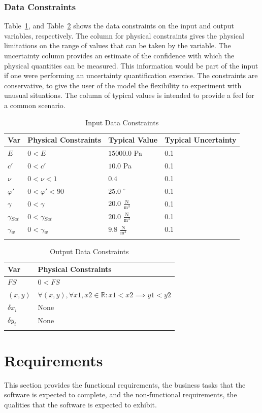 \documentclass[12pt]{article}
\begin{document}
\subsubsection{Data Constraints}
\label{Sec:DataCons}
Table~\ref{Table:InpuDataCons}, and Table~\ref{Table:OutpDataCons} shows the data constraints on the input and output variables, respectively. The column for physical constraints gives the physical limitations on the range of values that can be taken by the variable. The uncertainty column provides an estimate of the confidence with which the physical quantities can be measured. This information would be part of the input if one were performing an uncertainty quantification exercise. The constraints are conservative, to give the user of the model the flexibility to experiment with unusual situations. The column of typical values is intended to provide a feel for a common scenario.
\begin{longtable}{l l l l}
\toprule
Var & Physical Constraints & Typical Value & Typical Uncertainty
\\
\midrule
$E$ & $0<E$ & $15000.0$ Pa & 0.1
\\
$c'$ & $0<c'$ & $10.0$ Pa & 0.1
\\
$\nu{}$ & $0<\nu{}<1$ & $0.4$ & 0.1
\\
$\varphi{}'$ & $0<\varphi{}'<90$ & $25.0$ ${}^{\circ}$ & 0.1
\\
$\gamma{}$ & $0<\gamma{}$ & $20.0$ $\frac{\text{N}}{\text{m}^{3}}$ & 0.1
\\
$\gamma{}_{Sat}$ & $0<\gamma{}_{Sat}$ & $20.0$ $\frac{\text{N}}{\text{m}^{3}}$ & 0.1
\\
$\gamma{}_{w}$ & $0<\gamma{}_{w}$ & $9.8$ $\frac{\text{N}}{\text{m}^{3}}$ & 0.1
\\
\bottomrule
\caption{Input Data Constraints}
\label{Table:InpuDataCons}
\end{longtable}
\begin{longtable}{l l}
\toprule
Var & Physical Constraints
\\
\midrule
$FS$ & $0<FS$
\\
$(x,y)$ & $\forall{}(x,y), \forall{}x1,x2\in{}\mathbb{R}: x1<x2\implies{}y1<y2$
\\
$\delta{}x_{i}$ & None
\\
$\delta{}y_{i}$ & None
\\
\bottomrule
\caption{Output Data Constraints}
\label{Table:OutpDataCons}
\end{longtable}
\section{Requirements}
\label{Sec:Requ}
This section provides the functional requirements, the business tasks that the software is expected to complete, and the non-functional requirements, the qualities that the software is expected to exhibit.
\end{document}
